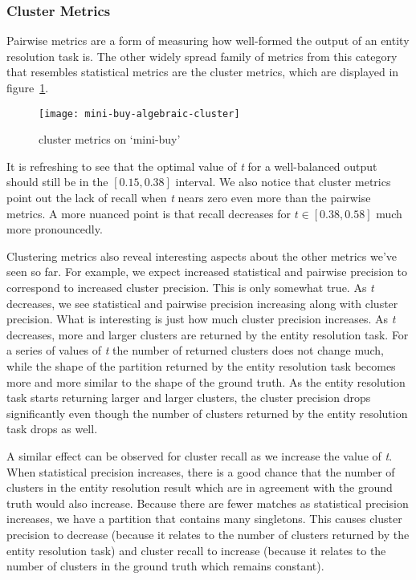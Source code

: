 \subsubsection{Cluster Metrics}

Pairwise metrics are a form of measuring how well-formed the output of an entity
resolution task is.
The other widely spread family of metrics from this category that resembles
statistical metrics are the cluster metrics, which are displayed in
figure~\ref{fig:mini-alg-cluster}.

\begin{figure}[!h]
    \centering
    \captionsetup{justification=centering}
    \texttt{[image: mini-buy-algebraic-cluster]}
    \caption{cluster metrics on `mini-buy'}
    \label{fig:mini-alg-cluster}
\end{figure}

It is refreshing to see that the optimal value of \textit{t} for a well-balanced
output should still be in the $\left[0.15,0.38\right]$ interval.
We also notice that cluster metrics point out the lack of recall when \textit{t}
nears zero even more than the pairwise metrics.
A more nuanced point is that recall decreases for $t \in \left[0.38,0.58\right]$
much more pronouncedly.

Clustering metrics also reveal interesting aspects about the other metrics we've
seen so far.
For example, we expect increased statistical and pairwise precision to
correspond to increased cluster precision.
This is only somewhat true.
As \textit{t} decreases, we see statistical and pairwise precision increasing
along with cluster precision.
What is interesting is just how much cluster precision increases.
As \textit{t} decreases, more and larger clusters are returned by the entity
resolution task.
For a series of values of \textit{t} the number of returned clusters does not
change much, while the shape of the partition returned by the entity resolution
task becomes more and more similar to the shape of the ground truth.
As the entity resolution task starts returning larger and larger clusters, the
cluster precision drops significantly even though the number of clusters
returned by the entity resolution task drops as well.

A similar effect can be observed for cluster recall as we increase the value of
\textit{t}.
When statistical precision increases, there is a good chance that the number of
clusters in the entity resolution result which are in agreement with the ground
truth would also increase.
Because there are fewer matches as statistical precision increases, we have a
partition that contains many singletons.
This causes cluster precision to decrease (because it relates to the number of
clusters returned by the entity resolution task) and cluster recall to increase
(because it relates to the number of clusters in the ground truth which remains
constant).

